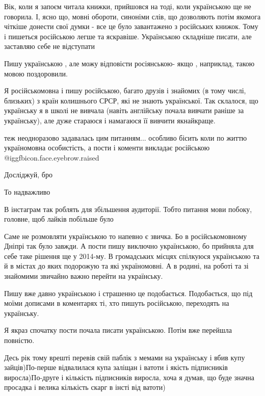 \begin{itemize}

Вік, коли я запоєм читала книжки, прийшовся на тоді, коли українською ще не
говорила. І, ясно що, мовні обороти, синоніми слів, що дозволяють потім якомога
чіткіше донести свої думки - все це було завантажено з російських книжок. Тому
і пишеться російською легше та яскравіше. Українською складніше писати, але
заставляю себе не відступати

Пишу українською , але можу відповісти росіянською- якщо , наприклад, такою мовою поздоровили.


Я російськомовна і пишу російською, багато друзів і знайомих (в тому числі,
близьких) з країн колишнього СРСР, які не знають української. Так склалося, що
українську я в школі не вивчала (навіть англійську почала вивчати раніше за
українську), але дуже стараюся і намагаюся її вивчити якнайкраще.


теж неодноразово задавалась цим питанням... особливо бісить коли по життю
україномовна особистість, а пости і коменти викладає російською @igg{fbicon.face.eyebrow.raised} 

Досліджуй, бро

То надважливо

В інстаграм так роблять для збільшення аудиторії. Тобто питання мови побоку, головне, щоб лайків побільше було


Саме не розмовляти українською то напевно є звичка. Бо в російськомовному
Дніпрі так було завжди. А пости пишу виключно українською, бо прийняла для себе
таке рішення ще у 2014-му. В громадських місцях спілкуюся українською та й в
містах до яких подорожую та які україномовні. А в родині, на роботі та зі
знайомими звичайно важно перейти на українську.


Пишу вже давно українською і страшенно це подобається. Подобається, що під
моїми дописами в коментарях ті, хто пишуть російською, переходять на
українську.


Я якраз спочатку пости почала писати українською. Потім вже перейшла повністю.


Десь рік тому врешті перевів свій паблік з мемами на українську і вбив купу
зайців)По-перше відвалилася купа заліщан і ватоти і якість підписників
виросла)По-друге і кількість підписників виросла, хоча я думав, що буде значна
просадка і велика кількість скарг в інсті від ватоти)


\end{itemize}
